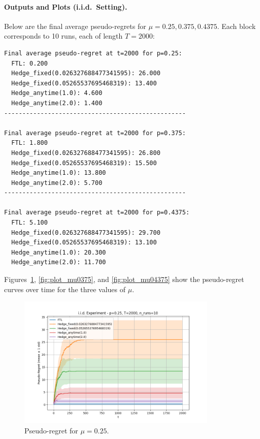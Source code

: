 \paragraph{Outputs and Plots (i.i.d.\ Setting).}
Below are the final average pseudo-regrets for \(\mu=0.25, 0.375, 0.4375\).  Each block corresponds to 10 runs, each of length \(T=2000\):

\begin{verbatim}
Final average pseudo-regret at t=2000 for p=0.25:
  FTL: 0.200
  Hedge_fixed(0.026327688477341595): 26.000
  Hedge_fixed(0.05265537695468319): 13.400
  Hedge_anytime(1.0): 4.600
  Hedge_anytime(2.0): 1.400
--------------------------------------------------

Final average pseudo-regret at t=2000 for p=0.375:
  FTL: 1.800
  Hedge_fixed(0.026327688477341595): 26.800
  Hedge_fixed(0.05265537695468319): 15.500
  Hedge_anytime(1.0): 13.800
  Hedge_anytime(2.0): 5.700
--------------------------------------------------

Final average pseudo-regret at t=2000 for p=0.4375:
  FTL: 5.100
  Hedge_fixed(0.026327688477341595): 29.700
  Hedge_fixed(0.05265537695468319): 13.100
  Hedge_anytime(1.0): 20.300
  Hedge_anytime(2.0): 11.700
\end{verbatim}

Figures~\ref{fig:plot_mu025}, \ref{fig:plot_mu0375}, and \ref{fig:plot_mu04375} show the pseudo-regret curves over time for the three values of \(\mu\).  

\begin{figure}[H]
\centering
\includegraphics[width=0.85\textwidth]{Code/plot_iid_025.png}
\caption{Pseudo-regret for \(\mu=0.25\).}
\label{fig:plot_mu025}
\end{figure}

